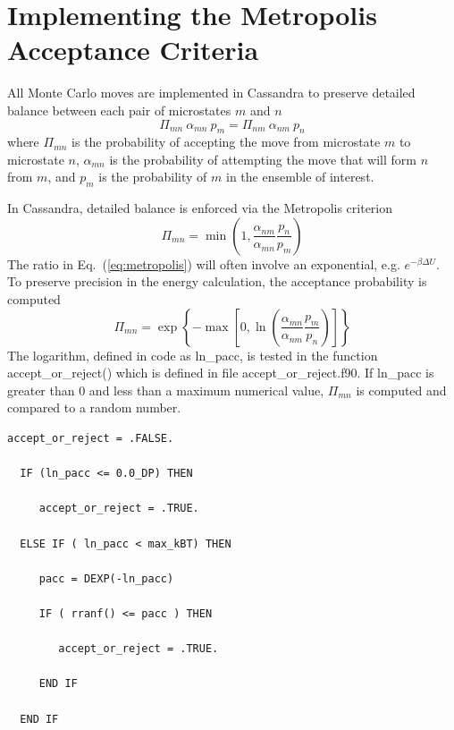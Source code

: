 \chapter{Implementing the Metropolis Acceptance Criteria}

All Monte Carlo moves are implemented in Cassandra to preserve detailed balance between each pair of microstates $m$ and $n$
\begin{equation}
\label{eq:detailedBalance}
\Pi_{mn}\ \alpha_{mn}\ p_m = \Pi_{nm}\ \alpha_{nm}\ p_n
\end{equation}
where $\Pi_{mn}$ is the probability of accepting the move from microstate $m$ to microstate $n$, $\alpha_{mn}$ is the probability of attempting the move that will form $n$ from $m$, and $p_m$ is the probability of $m$ in the ensemble of interest.

In Cassandra, detailed balance is enforced via the Metropolis criterion
\begin{equation}
\label{eq:metropolis}
\Pi_{mn} = \min\left(1, \frac{\alpha_{nm}}{\alpha_{mn}} \frac{p_n}{p_m} \right)
\end{equation}
The ratio in Eq.\ (\ref{eq:metropolis}) will often involve an exponential, e.g. $e^{-\beta \Delta U}$. To preserve precision in the energy calculation, the acceptance probability is computed
\begin{equation}
\label{eq:metropolis_2}
\Pi_{mn} = \exp\left\{-\max\left[0, \ln\left(\frac{\alpha_{mn}}{\alpha_{nm}} \frac{p_m}{p_n}\right)\right]\right\}
\end{equation}
The logarithm, defined in code as ln\_pacc, is tested in the function accept\_or\_reject() which is defined in file accept\_or\_reject.f90. If ln\_pacc is greater than 0 and less than a maximum numerical value, $\Pi_{mn}$ is computed and compared to a random number.

\begin{minipage}{\linewidth}
\begin{lstlisting}[firstnumber=47, caption=accept\_or\_reject.f90]
  accept_or_reject = .FALSE.

  IF (ln_pacc <= 0.0_DP) THEN

     accept_or_reject = .TRUE.

  ELSE IF ( ln_pacc < max_kBT) THEN

     pacc = DEXP(-ln_pacc)

     IF ( rranf() <= pacc ) THEN
    
        accept_or_reject = .TRUE.

     END IF

  END IF
\end{lstlisting}
\end{minipage}

